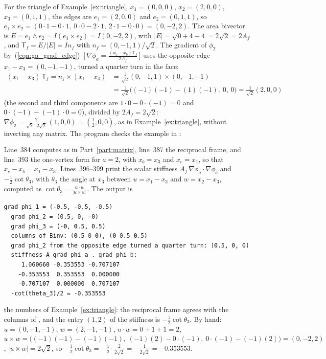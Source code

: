 \begin{example}
For the triangle of Example~\ref{ex:triangle}, $x_1 = (0,0,0)$, $x_2 = (2,0,0)$, $x_3 = (0,1,1)$, the edges are $e_1 = (2, 0, 0)$ and $e_2 = (0, 1, 1)$, so $e_1\times e_2 = (0\cdot 1 - 0\cdot 1,\ 0\cdot 0 - 2\cdot 1,\ 2\cdot 1 - 0\cdot 0) = (0, -2, 2)$. The area bivector is $E = e_1 \wedge e_2 = I (e_1 \times e_2) = I (0, -2, 2)$, with $|E| = \sqrt{0 + 4 + 4} = 2\sqrt 2 = 2 A_f$, and $\mathsf T_f = E / |E| = I n_f$ with $n_f = (0, -1, 1)/\sqrt 2$. The gradient of $\phi_2$ by~(\ref{eqn:ga_grad_edge})~[\,$\nabla\phi_a = \frac{(x_c - x_b)\mathsf T_f}{2A_f}$\,] uses the opposite edge $x_1 - x_3 = (0, -1, -1)$, turned a quarter turn in the face:
\begin{equation*}
\begin{aligned}
(x_1 - x_3)\, \mathsf T_f = n_f \times (x_1 - x_3) &= \tfrac{1}{\sqrt 2} (0, -1, 1) \times (0, -1, -1) \\
&= \tfrac{1}{\sqrt 2}\big((-1)(-1) - (1)(-1),\ 0,\ 0\big) = \tfrac{1}{\sqrt 2} (2, 0, 0)
\end{aligned}
\end{equation*}
(the second and third components are $1\cdot 0 - 0\cdot(-1) = 0$ and $0\cdot(-1) - (-1)\cdot 0 = 0$), divided by $2 A_f = 2\sqrt 2$: $\nabla\phi_2 = \frac{2}{\sqrt2\cdot 2\sqrt2}\,(1, 0, 0) = (\frac12, 0, 0)$, as in Example~\ref{ex:triangle}, without inverting any matrix. The program checks the example in :

Line~384 computes  as in Part~\ref{part:matrix}, line~387 the reciprocal frame, and line~393 the one-vertex form for $a = 2$, with $x_b = x_3$ and $x_c = x_1$, so that $x_c - x_b = x_1 - x_3$. Lines~396--399 print the scalar stiffness $A_f\,\nabla\phi_a\cdot\nabla\phi_b$ and $-\frac12\cot\theta_3$, with $\theta_3$ the angle at $x_3$ between $u = x_1 - x_3$ and $w = x_2 - x_3$, computed as $\cot\theta_3 = \frac{u\cdot w}{|u\times w|}$. The output is
\begin{lstlisting}[numbers=none]
  grad phi_1 = (-0.5, -0.5, -0.5)
  grad phi_2 = (0.5, 0, -0)
  grad phi_3 = (-0, 0.5, 0.5)
  columns of Binv: (0.5 0 0), (0 0.5 0.5)
  grad phi_2 from the opposite edge turned a quarter turn: (0.5, 0, 0)
  stiffness A grad phi_a . grad phi_b:
     1.060660 -0.353553 -0.707107
    -0.353553  0.353553  0.000000
    -0.707107  0.000000  0.707107
  -cot(theta_3)/2 = -0.353553
\end{lstlisting}
the numbers of Example~\ref{ex:triangle}: the reciprocal frame agrees with the columns of , and the entry $(1, 2)$ of the stiffness is $-\frac12\cot\theta_3$. By hand: $u = (0, -1, -1)$, $w = (2, -1, -1)$, $u\cdot w = 0 + 1 + 1 = 2$, $u\times w = \big((-1)(-1) - (-1)(-1),\ (-1)(2) - 0\cdot(-1),\ 0\cdot(-1) - (-1)(2)\big) = (0, -2, 2)$, $|u\times w| = 2\sqrt2$, so $-\frac12\cot\theta_3 = -\frac12\cdot\frac{2}{2\sqrt2} = -\frac{1}{2\sqrt2} = -0.353553$.
\end{example}

